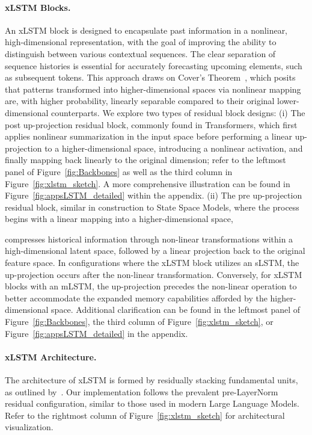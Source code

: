 \paragraph{xLSTM Blocks.}
\label{sec:xLSTMblock}
An xLSTM block is designed to encapsulate past information in a nonlinear, high-dimensional representation, with the goal of improving the ability to distinguish between various contextual sequences. The clear separation of sequence histories is essential for accurately forecasting upcoming elements, such as subsequent tokens. This approach draws on Cover’s Theorem~\citep{Cover:65}, which posits that patterns transformed into higher-dimensional spaces via nonlinear mapping are, with higher probability, linearly separable compared to their original lower-dimensional counterparts. We explore two types of residual block designs: (i) The post up-projection residual block, commonly found in Transformers, which first applies nonlinear summarization in the input space before performing a linear up-projection to a higher-dimensional space, introducing a nonlinear activation, and finally mapping back linearly to the original dimension; refer to the leftmost panel of Figure~\ref{fig:Backbones} as well as the third column in Figure~\ref{fig:xlstm_sketch}. A more comprehensive illustration can be found in Figure~\ref{fig:appsLSTM_detailed} within the appendix. (ii) The pre up-projection residual block, similar in construction to State Space Models, where the process begins with a linear mapping into a higher-dimensional space,

compresses historical information through non-linear transformations within a high-dimensional latent space, followed by a linear projection back to the original feature space. In configurations where the xLSTM block utilizes an sLSTM, the up-projection occurs after the non-linear transformation. Conversely, for xLSTM blocks with an mLSTM, the up-projection precedes the non-linear operation to better accommodate the expanded memory capabilities afforded by the higher-dimensional space. Additional clarification can be found in the leftmost panel of Figure~\ref{fig:Backbones}, the third column of Figure~\ref{fig:xlstm_sketch}, or Figure~\ref{fig:appsLSTM_detailed} in the appendix.

\paragraph{xLSTM Architecture.}
\label{sec:xLSTMarchitecure}
The architecture of xLSTM is formed by residually stacking fundamental units, as outlined by~\citep{Srivastava:15,He:16}. Our implementation follows the prevalent pre-LayerNorm~\citep{Ba:16b} residual configuration, similar to those used in modern Large Language Models. Refer to the rightmost column of Figure~\ref{fig:xlstm_sketch} for architectural visualization.

